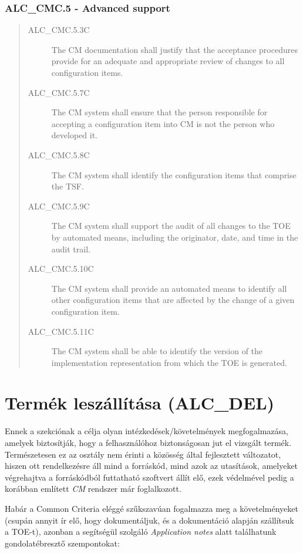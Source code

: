 \subsubsection{ALC\_CMC.5 - Advanced support}
\begin{quote}
    \begin{description}
        \item[ALC\_CMC.5.3C]{The CM documentation shall justify that the acceptance procedures
            provide for an adequate and appropriate review of changes to all configuration items.}
        \item[ALC\_CMC.5.7C]{The CM system shall ensure that the person responsible for accepting a
            configuration item into CM is not the person who developed it.}
        \item[ALC\_CMC.5.8C]{The CM system shall identify the configuration items that comprise the
            TSF.}
        \item[ALC\_CMC.5.9C]{The CM system shall support the audit of all changes to the TOE by
            automated means, including the originator, date, and time in the audit trail.}
        \item[ALC\_CMC.5.10C]{The CM system shall provide an automated means to identify all other
            configuration items that are affected by the change of a given configuration item.}
        \item[ALC\_CMC.5.11C]{The CM system shall be able to identify the version of the
            implementation representation from which the TOE is generated.}
    \end{description}
\end{quote}


\pagebreak[2]
\section{Termék leszállítása (ALC\_DEL)}

Ennek a szekciónak a célja olyan intézkedések/követelmények megfogalmazása, amelyek biztosítják,
hogy a felhasználóhoz biztonságosan jut el vizsgált termék. Természetesen ez az osztály nem érinti a
közösség által fejlesztett változatot, hiszen ott rendelkezésre áll mind a forráskód, mind azok az
utasítások, amelyeket végrehajtva a forráskódból futtatható szoftvert állít elő, ezek védelmével
pedig a korábban említett \emph{CM} rendszer már foglalkozott.

Habár a Common Criteria eléggé szűkszavúan fogalmazza meg a követelményeket (csupán annyit ír elő,
hogy dokumentáljuk, és a dokumentáció alapján szállítsuk a TOE-t), azonban a segítségül szolgáló
\emph{Application notes} alatt találhatunk gondolatébresztő szempontokat:

